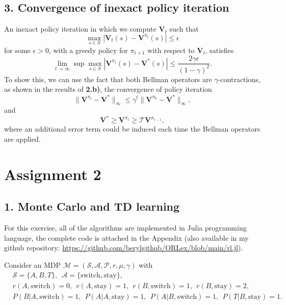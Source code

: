 \documentclass[12pt]{article}
\begin{document}
\subsection*{3. Convergence of inexact policy iteration}
An inexact policy iteration in which we compute $\mathbf{V}_t$ such that
\begin{equation*}
    \max_{s \in S}\left|\mathbf{V}_t(s) - \mathbf{V}^{\pi_t}(s)\right| \leq \epsilon
\end{equation*}
for some $\epsilon > 0$, with a greedy policy for $\pi_{t+1}$ with respect to $\mathbf{V}_t$, satisfies
\begin{equation}
    \lim_{t \rightarrow \infty} \sup \max_{s \in S}\left| \mathbf{V}^{\pi_t}(s) - \mathbf{V}^*(s)\right| \leq \frac{2\gamma\epsilon}{(1-\gamma)^2}.
\end{equation}
To show this, we can use the fact that both Bellman operators are $\gamma$-contractions, as shown in the results of \textbf{2.b)}, the convergence of policy iteration
\begin{equation*}
    \|\mathbf{V}^{\pi_t} - \mathbf{V}^*\|_\infty \leq \gamma^t\|\mathbf{V}^{\pi_0} - \mathbf{V}^*\|_\infty,
\end{equation*}
and
\begin{equation*}
    \mathbf{V}^* \geq \mathbf{V}^{\pi_t} \geq \mathcal{T}\mathbf{V}^{\pi_{t-1}},
\end{equation*}
where an additional error term could be induced each time the Bellman operators are applied.

\section*{Assignment 2}
\subsection*{1. Monte Carlo and TD learning}
For this exercise, all of the algorithms are implemented in Julia programming language, the complete code is attached in the Appendix (also available in my github repository: \url{https://github.com/berylgithub/ORLex/blob/main/rl.jl}).

Consider an MDP $\mathcal{M} = (\mathcal{S}, \mathcal{A}, \mathcal{P}, r,\mu, \gamma)$ with
\begin{equation*}
    \begin{split}
        &\mathcal{S} = \{A,B,T\}, ~~ \mathcal{A} = \{\text{switch},\text{stay}\}, \\
        &r(A, \text{switch})=0, ~~ r(A, \text{stay})=1, ~~ r(B, \text{switch})=1, ~~ r(B, \text{stay})=2, \\
        &P(B|A, \text{switch})=1, ~~ P(A|A, \text{stay})=1, ~~P(A|B, \text{switch})=1, ~~P(T|B, \text{stay})=1.
    \end{split}
\end{equation*}
\end{document}
